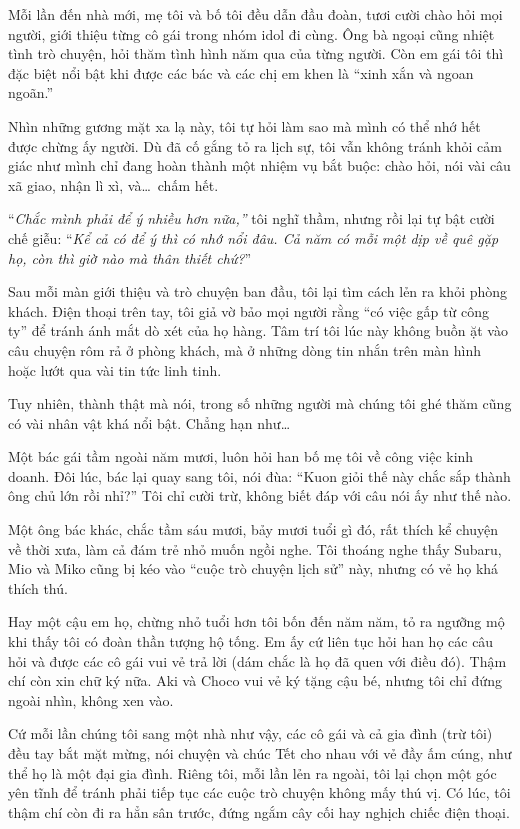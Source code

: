 \documentclass[../main.tex]{subfiles}
\begin{document}
Mỗi lần đến nhà mới, mẹ tôi và bố tôi đều dẫn đầu đoàn, tươi cười chào hỏi mọi người, giới thiệu từng cô gái trong nhóm idol đi cùng. Ông bà ngoại cũng nhiệt tình trò chuyện, hỏi thăm tình hình năm qua của từng người. Còn em gái tôi thì đặc biệt nổi bật khi được các bác và các chị em khen là ``xinh xắn và ngoan ngoãn.''

Nhìn những gương mặt xa lạ này, tôi tự hỏi làm sao mà mình có thể nhớ hết được chừng ấy người. Dù đã cố gắng tỏ ra lịch sự, tôi vẫn không tránh khỏi cảm giác như mình chỉ đang hoàn thành một nhiệm vụ bắt buộc: chào hỏi, nói vài câu xã giao, nhận lì xì, và\dots\ chấm hết.

``\textit{Chắc mình phải để ý nhiều hơn nữa,''} tôi nghĩ thầm, nhưng rồi lại tự bật cười chế giễu: ``\textit{Kể cả có để ý thì có nhớ nổi đâu. Cả năm có mỗi một dịp về quê gặp họ, còn thì giờ nào mà thân thiết chứ?}''

Sau mỗi màn giới thiệu và trò chuyện ban đầu, tôi lại tìm cách lẻn ra khỏi phòng khách. Điện thoại trên tay, tôi giả vờ bảo mọi người rằng ``có việc gấp từ công ty'' để tránh ánh mắt dò xét của họ hàng. Tâm trí tôi lúc này không buồn ặt vào câu chuyện rôm rả ở phòng khách, mà ở những dòng tin nhắn trên màn hình hoặc lướt qua vài tin tức linh tinh.

Tuy nhiên, thành thật mà nói, trong số những người mà chúng tôi ghé thăm cũng có vài nhân vật khá nổi bật. Chẳng hạn như\dots

\il

Một bác gái tầm ngoài năm mươi, luôn hỏi han bố mẹ tôi về công việc kinh doanh. Đôi lúc, bác lại quay sang tôi, nói đùa: ``Kuon giỏi thế này chắc sắp thành ông chủ lớn rồi nhỉ?'' Tôi chỉ cười trừ, không biết đáp với câu nói ấy như thế nào.

Một ông bác khác, chắc tầm sáu mươi, bảy mươi tuổi gì đó, rất thích kể chuyện về thời xưa, làm cả đám trẻ nhỏ muốn ngồi nghe. Tôi thoáng nghe thấy Subaru, Mio và Miko cũng bị kéo vào ``cuộc trò chuyện lịch sử'' này, nhưng có vẻ họ khá thích thú.

Hay một cậu em họ, chừng nhỏ tuổi hơn tôi bốn đến năm năm, tỏ ra ngưỡng mộ khi thấy tôi có đoàn thần tượng hộ tống. Em ấy cứ liên tục hỏi han họ các câu hỏi và được các cô gái vui vẻ trả lời (dám chắc là họ đã quen với điều đó). Thậm chí còn xin chữ ký nữa. Aki và Choco vui vẻ ký tặng cậu bé, nhưng tôi chỉ đứng ngoài nhìn, không xen vào.

\il

\ct

Cứ mỗi lần chúng tôi sang một nhà như vậy, các cô gái và cả gia đình (trừ tôi) đều tay bắt mặt mừng, nói chuyện và chúc Tết cho nhau với vẻ đầy ấm cúng, như thể họ là một đại gia đình. Riêng tôi, mỗi lần lẻn ra ngoài, tôi lại chọn một góc yên tĩnh để tránh phải tiếp tục các cuộc trò chuyện không mấy thú vị. Có lúc, tôi thậm chí còn đi ra hẳn sân trước, đứng ngắm cây cối hay nghịch chiếc điện thoại.
\end{document}
